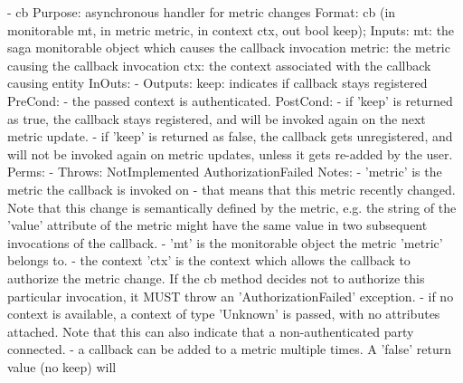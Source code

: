  
 \begin{myspec}
    - cb
      Purpose:  asynchronous handler for metric changes
      Format:   cb                 (in  monitorable mt,
                                    in  metric      metric,
                                    in  context     ctx,
                                    out bool        keep);
      Inputs:   mt:                 the saga monitorable object
                                    which causes the callback
                                    invocation
                metric:             the metric causing the
                                    callback invocation
                ctx:                the context associated with
                                    the callback causing entity
      InOuts:   -
      Outputs:  keep:               indicates if callback stays
                                    registered
      PreCond:  - the passed context is authenticated.
      PostCond: - if 'keep' is returned as true, the callback
                  stays registered, and will be invoked again on
                  the next metric update.
                - if 'keep' is returned as false, the callback
                  gets unregistered, and will not be invoked
                  again on metric updates, unless it gets
                  re-added by the user.
      Perms:    -
      Throws:   NotImplemented
                AuthorizationFailed
      Notes:    - 'metric' is the metric the callback is
                  invoked on - that means that this metric
                  recently changed.  Note that this change is
                  semantically defined by the metric, e.g. the
                  string of the 'value' attribute of the metric
                  might have the same value in two subsequent
                  invocations of the callback.
                - 'mt' is the monitorable object the metric 
                  'metric' belongs to.
                - the context 'ctx' is the context which allows
                  the callback to authorize the metric change.
                  If the cb method decides not to authorize this
                  particular invocation, it MUST throw an
                  'AuthorizationFailed' exception.
                - if no context is available, a context of type 
                  'Unknown' is passed, with no attributes
                  attached.  Note that this can also indicate
                  that a non-authenticated party connected.
                - a callback can be added to a metric multiple
                  times.  A 'false' return value (no keep) will 

\end{myspec}
